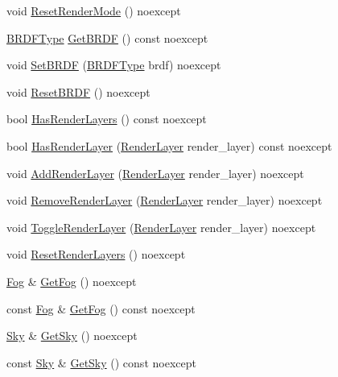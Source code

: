 \begin{DoxyCompactItemize}
\item 
void \hyperlink{classmage_1_1_camera_settings_aa8facc0ddcd3e3d9f3c05c9f44c77b5d}{Reset\+Render\+Mode} () noexcept
\item 
\hyperlink{namespacemage_ae7a7a03a7b34d7e2689689bb8295cd38}{B\+R\+D\+F\+Type} \hyperlink{classmage_1_1_camera_settings_a31504f7e9b23404ee1b200561b8dd789}{Get\+B\+R\+DF} () const noexcept
\item 
void \hyperlink{classmage_1_1_camera_settings_a8fbc3d6013d5f711decaf6f7348f2e15}{Set\+B\+R\+DF} (\hyperlink{namespacemage_ae7a7a03a7b34d7e2689689bb8295cd38}{B\+R\+D\+F\+Type} brdf) noexcept
\item 
void \hyperlink{classmage_1_1_camera_settings_a1f8b3952282d153db4fb6416e9d933b7}{Reset\+B\+R\+DF} () noexcept
\item 
bool \hyperlink{classmage_1_1_camera_settings_a838dfb8f3d32d3d23a7c72719ce182f3}{Has\+Render\+Layers} () const noexcept
\item 
bool \hyperlink{classmage_1_1_camera_settings_a5f5f7e1019db2e65cddc1a62ae30efc7}{Has\+Render\+Layer} (\hyperlink{namespacemage_a8b4a82582105b0299e2c2be5af7255d6}{Render\+Layer} render\+\_\+layer) const noexcept
\item 
void \hyperlink{classmage_1_1_camera_settings_ab1dca8b8f52daf55614592e0bb640ae9}{Add\+Render\+Layer} (\hyperlink{namespacemage_a8b4a82582105b0299e2c2be5af7255d6}{Render\+Layer} render\+\_\+layer) noexcept
\item 
void \hyperlink{classmage_1_1_camera_settings_a358ab9da30af67ca8b1ea2a5eb5a2710}{Remove\+Render\+Layer} (\hyperlink{namespacemage_a8b4a82582105b0299e2c2be5af7255d6}{Render\+Layer} render\+\_\+layer) noexcept
\item 
void \hyperlink{classmage_1_1_camera_settings_a47c34af7eddc2a0f6256d137b5813a4c}{Toggle\+Render\+Layer} (\hyperlink{namespacemage_a8b4a82582105b0299e2c2be5af7255d6}{Render\+Layer} render\+\_\+layer) noexcept
\item 
void \hyperlink{classmage_1_1_camera_settings_afc9bcdb1f27adfb1c69a668a24113b46}{Reset\+Render\+Layers} () noexcept
\item 
\hyperlink{classmage_1_1_fog}{Fog} \& \hyperlink{classmage_1_1_camera_settings_ae1ba03a765f304703502bcd7de15d436}{Get\+Fog} () noexcept
\item 
const \hyperlink{classmage_1_1_fog}{Fog} \& \hyperlink{classmage_1_1_camera_settings_a84098b0518f7eada941944b8155372a8}{Get\+Fog} () const noexcept
\item 
\hyperlink{classmage_1_1_sky}{Sky} \& \hyperlink{classmage_1_1_camera_settings_add70e097b67b2a181eb61b2b8f1263e0}{Get\+Sky} () noexcept
\item 
const \hyperlink{classmage_1_1_sky}{Sky} \& \hyperlink{classmage_1_1_camera_settings_a538464550850914bc531ba7b12515ce1}{Get\+Sky} () const noexcept
\end{DoxyCompactItemize}
